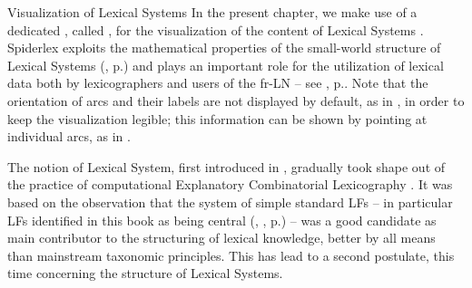 \label{rem:visualizationLS}\begin{soundbox}{Visualization of Lexical Systems}
In the present chapter, we make use of a dedicated , called , for the visualization of the content of Lexical Systems \parencite{OllingerEtAl2020,OllingerPolguere2020b-e}. Spiderlex exploits the mathematical properties of the small-world structure of Lexical Systems (, p.\thinspace\pageref{sec:formalPropertiesLS}) and plays an important role for the utilization of lexical data both by lexicographers and users of the fr-LN -- see , p.\thinspace\pageref{sec:lexicographyOfLNs}. Note that the orientation of arcs and their labels are not displayed by default, as in , in order to keep the visualization legible; this information can be shown by pointing at individual arcs, as in .\footnotemark
\end{soundbox}

The notion of Lexical System, first introduced in \textcite{Polguere2009-e}, gradually took shape out of the practice of computational Explanatory Combinatorial Lexicography \parencite{Steinlinetal2005,PolguereMelcuk2006}. It was based on the observation that the system of simple standard LFs -- in particular LFs identified in this book as being central (, , p.\thinspace\pageref{sec:centralLFs}) -- was a good candidate as main contributor to the structuring of lexical knowledge, better by all means than mainstream taxonomic principles. This has lead to a second postulate, this time concerning the structure of Lexical Systems.

